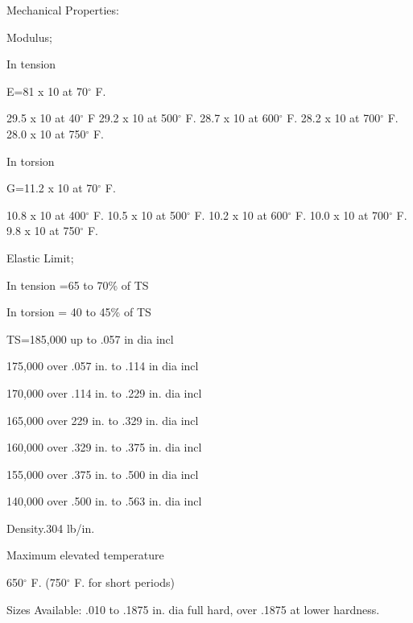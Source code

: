 \documentclass[10pt]{article}
\begin{document}
Mechanical Properties:

Modulus;

In tension

E=81 x 10 at 70$^\circ$ F.

29.5 x 10 at 40$^\circ$ F
29.2 x 10 at 500$^\circ$ F.
28.7 x 10 at 600$^\circ$ F.
28.2 x 10 at 700$^\circ$ F.
28.0 x 10 at 750$^\circ$ F.

In torsion

G=11.2 x 10 at 70$^\circ$ F.

10.8 x 10 at 400$^\circ$ F.
10.5 x 10 at 500$^\circ$ F.
10.2 x 10 at 600$^\circ$ F.
10.0 x 10 at 700$^\circ$ F.
9.8 x 10 at 750$^\circ$ F.

Elastic Limit;

In tension =65 to 70\% of TS

In torsion = 40 to 45\% of TS

TS=185,000 up to .057 in dia incl

175,000 over .057 in. to .114 in dia incl

170,000 over .114 in. to .229 in. dia incl

165,000 over 229 in. to .329 in. dia incl

160,000 over .329 in. to .375 in. dia incl

155,000 over .375 in. to .500 in dia incl

140,000 over .500 in. to .563 in. dia incl

Density.304 lb/in.

Maximum elevated temperature

650$^\circ$ F. (750$^\circ$ F. for short periods)

Sizes Available:
.010 to .1875 in. dia full hard, over .1875 at lower hardness.
\end{document}
